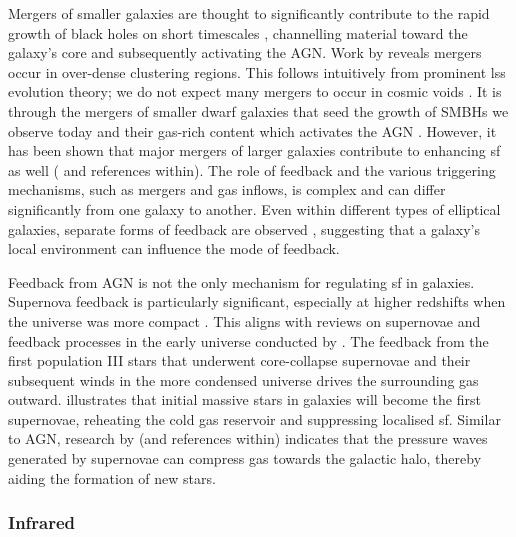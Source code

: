 Mergers of smaller galaxies are thought to significantly contribute to the rapid growth of black holes on short timescales \citep{kormendy_coevolution_2013}, channelling material toward the galaxy's core and subsequently activating the AGN. Work by \cite{hopkins_cosmological_2008} reveals mergers occur in over-dense clustering regions. This follows intuitively from prominent \gls{lss} evolution theory; we do not expect many mergers to occur in cosmic voids \citep{coil_large-scale_2013}. It is through the mergers of smaller dwarf galaxies that seed the growth of SMBHs we observe today \citep{forbes_keckkcwi_2024, ziparo_primordial_2024} and their gas-rich content which activates the AGN \citep{hopkins_how_2010}. However, it has been shown that major mergers of larger galaxies contribute to enhancing \gls{sf} as well (\citealp{volonteri_assembly_2003, hopkins_how_2010} and references within). The role of feedback and the various triggering mechanisms, such as mergers and gas inflows, is complex and can differ significantly from one galaxy to another. Even within different types of elliptical galaxies, separate forms of feedback are observed \citep{kormendy_coevolution_2013}, suggesting that a galaxy's local environment can influence the mode of feedback. 

Feedback from AGN is not the only mechanism for regulating \gls{sf} in galaxies. Supernova feedback is particularly significant, especially at higher redshifts when the universe was more compact \citep{heckman_nature_1990, katsianis_evolution_2017}. This aligns with reviews on supernovae and feedback processes in the early universe conducted by \cite{volonteri_assembly_2003, cayrel_first_2004, sokasian_cosmic_2004, klessen_first_2023}. The feedback from the first population III stars that underwent core-collapse supernovae and their subsequent winds in the more condensed universe drives the surrounding gas outward. \cite{croton_many_2006} illustrates that initial massive stars in galaxies will become the first supernovae, reheating the cold gas reservoir and suppressing localised \gls{sf}. Similar to AGN, research by \cite{sokasian_cosmic_2004} (and references within) indicates that the pressure waves generated by supernovae can compress gas towards the galactic halo, thereby aiding the formation of new stars.

\subsubsection{Infrared}

